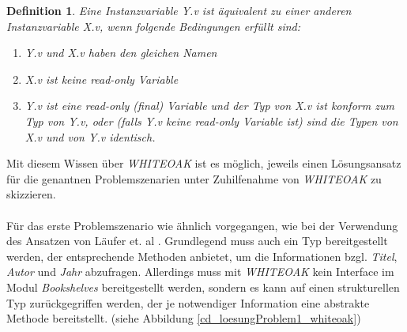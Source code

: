 \documentclass[11pt, 
ngerman,
doublespacing,
chapterinoneline, %
consistentlayout, %
]{scrartcl}
\newtheorem{definition}{Definition}
\begin{document}
\begin{definition}\label{def_equiVarWHITEOAK}
Eine Instanzvariable \emph{Y.v} ist äquivalent zu einer anderen Instanzvariable \emph{X.v}, wenn folgende Bedingungen erfüllt sind:
\begin{enumerate}
\item \emph{Y.v} und \emph{X.v} haben den gleichen Namen
\item \emph{X.v} ist keine read-only Variable
\item \emph{Y.v} ist eine read-only (final) Variable und der Typ von \emph{X.v} ist konform zum Typ von \emph{Y.v}, oder (falls \emph{Y.v} keine read-only Variable ist) sind die Typen von \emph{X.v} und von \emph{Y.v} identisch. 
\end{enumerate}
\end{definition}
Mit diesem Wissen über \emph{WHITEOAK} ist es möglich, jeweils einen Lösungsansatz für die genantnen Problemszenarien unter Zuhilfenahme von \emph{WHITEOAK} zu skizzieren.\\\\
Für das erste Problemszenario wie ähnlich vorgegangen, wie bei der Verwendung des Ansatzen von Läufer et. al \cite{structconfjava}. Grundlegend muss auch ein Typ bereitgestellt werden, der entsprechende Methoden anbietet, um die Informationen bzgl. \emph{Titel}, \emph{Autor} und \emph{Jahr} abzufragen. 
Allerdings muss mit \emph{WHITEOAK} kein Interface im Modul \emph{Bookshelves} bereitgestellt werden, sondern es kann auf einen strukturellen Typ zurückgegriffen werden, der je notwendiger Information eine abstrakte Methode bereitstellt. (siehe Abbildung \ref{cd_loesungProblem1_whiteoak})
\end{document}
